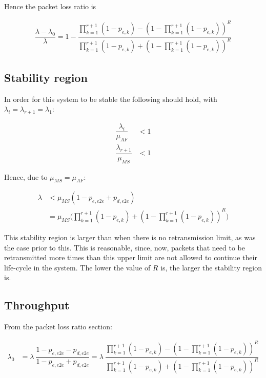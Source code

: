 Hence the packet loss ratio is

\begin{align*}
  \dfrac{\lambda - \lambda_0}{\lambda} = 1 - \dfrac{\prod\limits_{k=1}^{r+1} (1 - p_{e,k}) - (1 - \prod\limits_{k=1}^{r+1} (1 - p_{e,k}))^R}
        {\prod\limits_{k=1}^{r+1} (1 - p_{e,k}) + (1 - \prod\limits_{k=1}^{r+1} (1 - p_{e,k}))^R}
\end{align*}


\subsection{Stability region}

In order for this system to be stable the following should hold, with
$\lambda_i = \lambda_{r+1} = \lambda_1$:

\begin{align*}
  \dfrac{\lambda_i}{\mu_{AF}} &< 1 \\
  \dfrac{\lambda_{r+1}}{\mu_{MS}} &< 1
\end{align*}

Hence, due to $\mu_{MS} = \mu_{AF}$:

\begin{align*}
  \lambda &< \mu_{MS} (1 - p_{e,e2e} + p_{d,e2e}) \\
          &= \mu_{MS}\Big(\prod_{k=1}^{r+1} (1 - p_{e,k}) + (1 - \prod_{k=1}^{r+1} (1 - p_{e,k}))^R\Big)
\end{align*}

This stability region is larger than when there is no retransmission limit, as
was the case prior to this. This is reasonable, since, now, packets that need to
be retransmitted more times than this upper limit are not allowed to continue
their life-cycle in the system. The lower the value of $R$ is, the larger the
stability region is.


\subsection{Throughput}

From the packet loss ratio section:

\begin{align*}
  \lambda_0 &= \lambda\ \dfrac{1 - p_{e,e2e} - p_{d,e2e}}{1 - p_{e,e2e} + p_{d,e2e}} =
  \lambda\ \dfrac{\prod\limits_{k=1}^{r+1} (1 - p_{e,k}) - (1 - \prod\limits_{k=1}^{r+1} (1 - p_{e,k}))^R}
        {\prod\limits_{k=1}^{r+1} (1 - p_{e,k}) + (1 - \prod\limits_{k=1}^{r+1} (1 - p_{e,k}))^R} \\
\end{align*}


